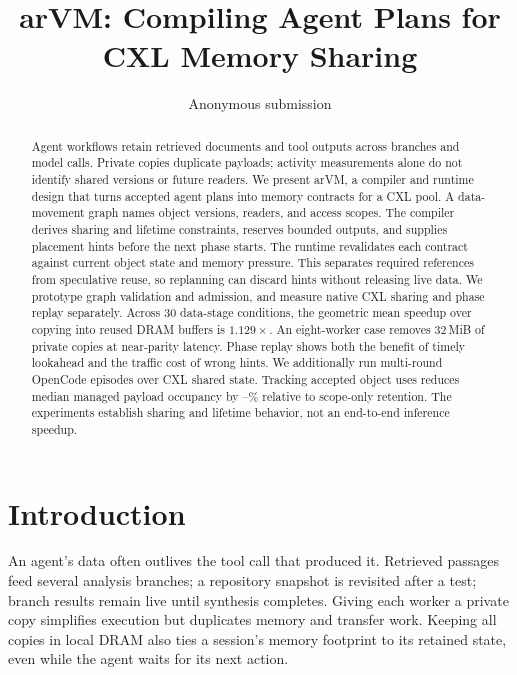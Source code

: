 \documentclass[letterpaper,twocolumn,10pt]{article}
\newcommand{\arvm}{arVM\xspace}
\begin{document}
\title{\arvm: Compiling Agent Plans for CXL Memory Sharing}

\author{{\rm Anonymous submission}}
\date{}
\maketitle

\begin{abstract}
Agent workflows retain retrieved documents and tool outputs across branches
and model calls. Private copies duplicate payloads; activity measurements
alone do not identify shared versions or future readers. We present \arvm,
a compiler and runtime design
that turns accepted agent plans into memory contracts for a CXL pool.
A data-movement graph names object versions, readers, and access scopes.
The compiler derives sharing and lifetime constraints, reserves bounded
outputs, and supplies placement hints before the next phase starts.
The runtime revalidates each contract against current object state and
memory pressure. This separates required references from speculative reuse,
so replanning can discard hints without releasing live data.
We prototype graph validation and admission, and measure native CXL sharing
and phase replay separately. Across 30 data-stage conditions, the geometric mean speedup over
copying into reused DRAM buffers is $1.129\times$. An eight-worker case
removes 32\,MiB of private copies at near-parity latency. Phase replay shows
both the benefit of timely lookahead and the traffic cost of wrong hints.
We additionally run \ProfileEpisodes{} multi-round OpenCode episodes over
CXL shared state. Tracking accepted object uses reduces median managed
payload occupancy by \ProfileTwoSaving--\ProfileFourSaving\% relative to
scope-only retention. The experiments establish sharing and lifetime behavior,
not an end-to-end inference speedup.
\end{abstract}

\section{Introduction}

An agent's data often outlives the tool call that produced it. Retrieved
passages feed several analysis branches; a repository snapshot is revisited
after a test; branch results remain live until synthesis completes. Giving
each worker a private copy simplifies execution but duplicates memory and
transfer work. Keeping all copies in local DRAM also ties a session's memory
footprint to its retained state, even while the agent waits for its next action.
\end{document}
